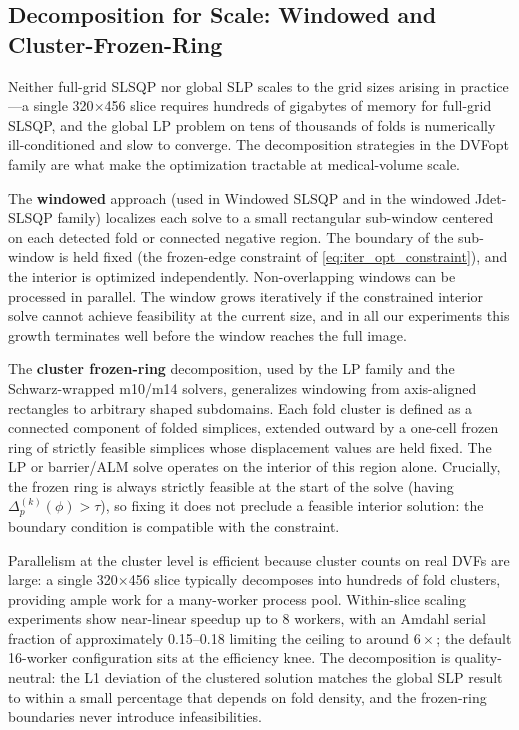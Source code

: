 \subsection{Decomposition for Scale: Windowed and Cluster-Frozen-Ring}
\label{sec:decomposition}

Neither full-grid SLSQP nor global SLP scales to the grid sizes arising in practice—a single 320$\times$456 slice requires hundreds of gigabytes of memory for full-grid SLSQP, and the global LP problem on tens of thousands of folds is numerically ill-conditioned and slow to converge. The decomposition strategies in the DVFopt family are what make the optimization tractable at medical-volume scale.

The \textbf{windowed} approach (used in Windowed SLSQP and in the windowed Jdet-SLSQP family) localizes each solve to a small rectangular sub-window centered on each detected fold or connected negative region. The boundary of the sub-window is held fixed (the frozen-edge constraint of \autoref{eq:iter_opt_constraint}), and the interior is optimized independently. Non-overlapping windows can be processed in parallel. The window grows iteratively if the constrained interior solve cannot achieve feasibility at the current size, and in all our experiments this growth terminates well before the window reaches the full image.

The \textbf{cluster frozen-ring} decomposition, used by the LP family and the Schwarz-wrapped m10/m14 solvers, generalizes windowing from axis-aligned rectangles to arbitrary shaped subdomains. Each fold cluster is defined as a connected component of folded simplices, extended outward by a one-cell frozen ring of strictly feasible simplices whose displacement values are held fixed. The LP or barrier/ALM solve operates on the interior of this region alone. Crucially, the frozen ring is always strictly feasible at the start of the solve (having $\Delta^{(k)}_p(\phi) > \tau$), so fixing it does not preclude a feasible interior solution: the boundary condition is compatible with the constraint.

Parallelism at the cluster level is efficient because cluster counts on real DVFs are large: a single 320$\times$456 slice typically decomposes into hundreds of fold clusters, providing ample work for a many-worker process pool. Within-slice scaling experiments show near-linear speedup up to 8 workers, with an Amdahl serial fraction of approximately 0.15--0.18 limiting the ceiling to around $6\times$; the default 16-worker configuration sits at the efficiency knee. The decomposition is quality-neutral: the L1 deviation of the clustered solution matches the global SLP result to within a small percentage that depends on fold density, and the frozen-ring boundaries never introduce infeasibilities.

